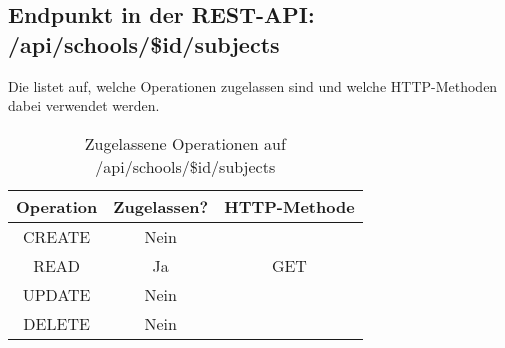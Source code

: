 \subsection{Endpunkt in der REST-API: /api/schools/\$id/subjects}
Die  listet auf, welche Operationen zugelassen sind und welche HTTP-Methoden dabei verwendet werden. 

\begin{table}[!htbp]
	\begin{tabular}{|c|c|c|}
		\hline
			\textbf{Operation} & \textbf{Zugelassen?} & \textbf{HTTP-Methode} \\ \hline
			CREATE & Nein & \\ \hline 
			READ & Ja & GET \\ \hline
			UPDATE & Nein & \\ \hline 
			DELETE & Nein & \\ \hline
	\end{tabular}

		\caption{Zugelassene Operationen auf /api/schools/\$id/subjects}
		\label{tab:rest:api:schools:id:subjects:meth}
\end{table}

